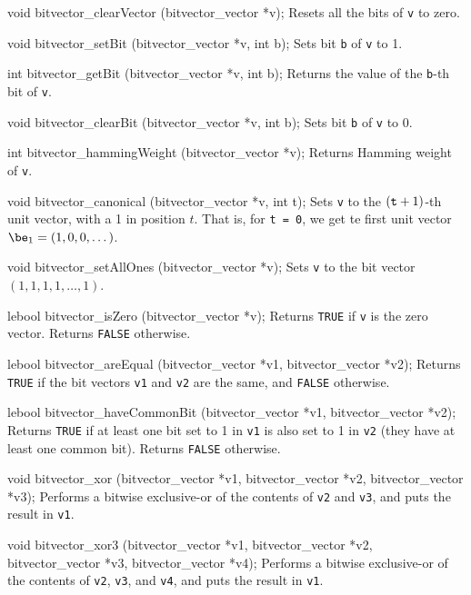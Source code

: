 void bitvector_clearVector (bitvector_vector *v);
\endcode
 \tab
Resets all the bits of {\tt v} to zero.
 \endtab
\code

void bitvector_setBit (bitvector_vector *v, int b);
\endcode
 \tab
Sets bit {\tt b} of {\tt v} to 1.
 \endtab
\code

int bitvector_getBit (bitvector_vector *v, int b);
\endcode
 \tab
Returns the value of the {\tt b}-th bit of {\tt v}.
 \endtab
\code

void bitvector_clearBit (bitvector_vector *v, int b);
\endcode
 \tab
Sets bit {\tt b} of {\tt v} to 0.
 \endtab
\code

int bitvector_hammingWeight (bitvector_vector *v);
\endcode
 \tab
Returns Hamming weight of {\tt v}.
 \endtab
\code

void bitvector_canonical (bitvector_vector *v, int t);
\endcode
 \tab
Sets {\tt v} to the $({\tt t}+1)$-th unit vector, with a 1 in position $t$.
That is, for {\tt t = 0}, we get te first unit vector $\be_1 = (1,0,0,\dots)$.
 \endtab
\code

void bitvector_setAllOnes (bitvector_vector *v);
\endcode
 \tab
Sets {\tt v} to the bit vector $(1, 1, 1, 1,\dots , 1)$.
 \endtab
\code

lebool bitvector_isZero (bitvector_vector *v);
\endcode
 \tab
Returns {\tt TRUE} if {\tt v} is the zero vector.  Returns {\tt FALSE} otherwise.
\endtab
\code

lebool bitvector_areEqual (bitvector_vector *v1, bitvector_vector *v2);
\endcode
\tab
Returns {\tt TRUE} if the bit vectors {\tt v1} and {\tt v2} are the same,
and {\tt FALSE} otherwise.
\endtab
\code

lebool bitvector_haveCommonBit (bitvector_vector *v1, bitvector_vector *v2);
\endcode
 \tab
Returns {\tt TRUE} if at least one bit set to 1 in {\tt v1} is also set to 1 in {\tt v2}
(they have at least one common bit).  Returns {\tt FALSE} otherwise.
 \endtab
\code

void bitvector_xor (bitvector_vector *v1, bitvector_vector *v2, 
                    bitvector_vector *v3);
\endcode
 \tab
Performs a bitwise exclusive-or of the contents of \texttt{v2} and \texttt{v3},
and puts the result in \texttt{v1}.
\endtab
\code

void bitvector_xor3 (bitvector_vector *v1, bitvector_vector *v2,
                     bitvector_vector *v3, bitvector_vector *v4);
\endcode
 \tab
Performs a bitwise exclusive-or of the contents of \texttt{v2}, \texttt{v3}, and \texttt{v4},
and puts the result in \texttt{v1}.
 \endtab
\code

